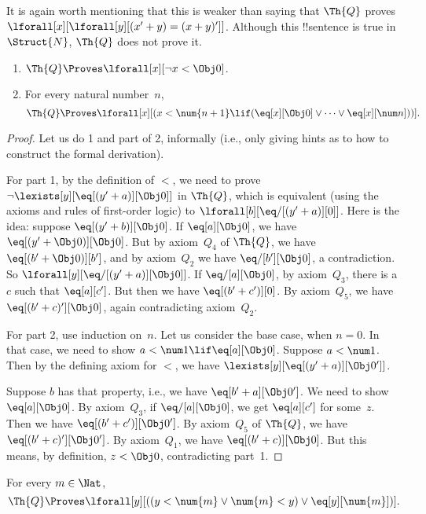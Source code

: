 \documentclass[../../../include/open-logic-section]{subfiles}
\begin{document}
It is again worth mentioning that this is weaker than saying that
$\Th{Q}$ proves $\lforall[x][\lforall[y][(x' + y) = (x + y)']]$.
Although this !!{sentence} is true in~$\Struct{N}$, $\Th{Q}$ does not
prove it.

\begin{lem}
\begin{enumerate}
\item $\Th{Q} \Proves \lforall[x][\lnot x < \Obj 0]$.
\item For every natural number~$n$, 
  \[
  \Th{Q} \Proves
  \lforall[x][(x < \num {n+1} \lif (\eq[x][\Obj 0] \lor \dots \lor
    \eq[x][\num n]))].
  \]
\end{enumerate}
\end{lem}

\begin{proof}
Let us do 1 and part of 2, informally (i.e., only giving hints as to
how to construct the formal derivation).

For part 1, by the definition of $<$, we need to prove $\lnot
\lexists[y][\eq[(y'+a)][\Obj 0]]$ in $\Th{Q}$, which is equivalent
(using the axioms and rules of first-order logic) to
$\lforall[b][\eq/[(y' + a)][0]]$. Here is the idea: suppose
$\eq[(y'+b)][\Obj 0]$. If $\eq[a][\Obj 0]$, we have $\eq[(y' + \Obj
  0)][\Obj 0]$. But by axiom~$Q_4$ of $\Th{Q}$, we have $\eq[(b' +
  \Obj 0)][b']$, and by axiom~$Q_2$ we have $\eq/[b'][\Obj 0]$, a
contradiction. So $\lforall[y][\eq/[(y' +a)][\Obj 0]]$. If
$\eq/[a][\Obj 0]$, by axiom~$Q_3$, there is a $c$ such that
$\eq[a][c']$. But then we have $\eq[(b' + c')][0]$. By axiom~$Q_5$, we
have $\eq[(b' + c)'][\Obj 0]$, again contradicting axiom~$Q_2$.

For part 2, use induction on~$n$. Let us consider the base case, when
$n = 0$. In that case, we need to show $a < \num 1 \lif \eq[a][\Obj
  0]$. Suppose $a < \num 1$. Then by the defining axiom for $<$, we
have $\lexists[y][\eq[(y'+a)][\Obj 0']]$.

Suppose $b$ has that property, i.e., we have $\eq[b'+a][\Obj 0']$. We
need to show $\eq[a][\Obj 0]$. By axiom~$Q_3$, if $\eq/[a][\Obj 0]$,
we get $\eq[a][c']$ for some~$z$. Then we have $\eq[(b' + c')][\Obj
  0']$. By axiom~$Q_5$ of $\Th{Q}$, we have $\eq[(b'+c)'][\Obj
  0']$. By axiom~$Q_1$, we have $\eq[(b' + c)][\Obj 0]$. But this
means, by definition, $z < \Obj 0$, contradicting part~1.
\end{proof}

\begin{lem}
   For every $m \in \Nat$,
  \[
  \Th{Q} \Proves
  \lforall[y][((y < \num{m} \lor \num{m} < y) \lor \eq[y][\num{m}])].
  \]
\end{lem}
\end{document}
